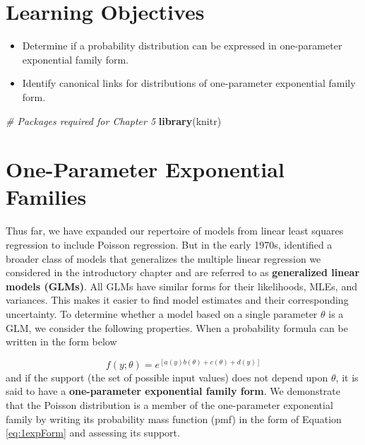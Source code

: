 \documentclass[
]{krantz}
\newenvironment{Shaded}{\begin{snugshade}}{\end{snugshade}}
\newcommand{\CommentTok}[1]{\textcolor[rgb]{0.37,0.37,0.37}{\textit{#1}}}
\newcommand{\KeywordTok}[1]{\textcolor[rgb]{0.27,0.27,0.27}{\textbf{#1}}}
\newcommand{\NormalTok}[1]{#1}
\providecommand{\tightlist}{%
  \setlength{\itemsep}{0pt}\setlength{\parskip}{0pt}}
\begin{document}
\hypertarget{learning-objectives-4}{%
\section{Learning Objectives}\label{learning-objectives-4}}

\begin{itemize}
\tightlist
\item
  Determine if a probability distribution can be expressed in one-parameter exponential family form.
\item
  Identify canonical links for distributions of one-parameter exponential family form.
\end{itemize}

\begin{Shaded}
\begin{Highlighting}[]
\CommentTok{# Packages required for Chapter 5}
\KeywordTok{library}\NormalTok{(knitr)}
\end{Highlighting}
\end{Shaded}

\hypertarget{one-parameter-exponential-families}{%
\section{One-Parameter Exponential Families}\label{one-parameter-exponential-families}}

Thus far, we have expanded our repertoire of models from linear least squares regression to include Poisson regression. But in the early 1970s, \citet{Nelder1972} identified a broader class of models that generalizes the multiple linear regression we considered in the introductory chapter and are referred to as \textbf{generalized linear models (GLMs)}.  All GLMs have similar forms for their likelihoods, MLEs, and variances. This makes it easier to find model estimates and their corresponding uncertainty. To determine whether a model based on a single parameter \(\theta\) is a GLM, we consider the following properties.
When a probability formula can be written in the form below

\begin{equation}
f(y;\theta)=e^{[a(y)b(\theta)+c(\theta)+d(y)]}
\label{eq:1expForm}
\end{equation}
and if the support (the set of possible input values) does not depend upon \(\theta\), it is said to have a \textbf{one-parameter exponential family form}.  We demonstrate that the Poisson distribution is a member of the one-parameter exponential family by writing its probability mass function (pmf) in the form of Equation \eqref{eq:1expForm} and assessing its support.
\end{document}
